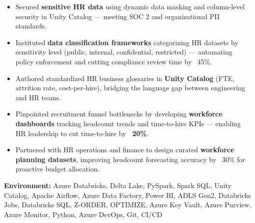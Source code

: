 \documentclass[a4paper,10pt]{article}
\begin{document}
\begin{itemize}
    \item Secured \textbf{sensitive HR data} using dynamic data masking and column-level security in Unity Catalog — meeting SOC 2 and organizational PII standards.
    \item Instituted \textbf{data classification frameworks} categorizing HR datasets by sensitivity level (public, internal, confidential, restricted) — automating policy enforcement and cutting compliance review time by ~45\%.
    \item Authored standardized HR business glossaries in \textbf{Unity Catalog} (FTE, attrition rate, cost-per-hire), bridging the language gap between engineering and HR teams.
    \item Pinpointed recruitment funnel bottlenecks by developing \textbf{workforce dashboards} tracking headcount trends and time-to-hire KPIs — enabling HR leadership to cut time-to-hire by \textbf{~20\%}.
    \item Partnered with HR operations and finance to design curated \textbf{workforce planning datasets}, improving headcount forecasting accuracy by ~30\% for proactive budget allocation.
\end{itemize}

\textbf{Environment:} Azure Databricks, Delta Lake, PySpark, Spark SQL, Unity Catalog, Apache Airflow, Azure Data Factory, Power BI, ADLS Gen2, Databricks Jobs, Databricks SQL, Z-ORDER, OPTIMIZE, Azure Key Vault, Azure Purview, Azure Monitor, Python, Azure DevOps, Git, CI/CD
\end{document}
